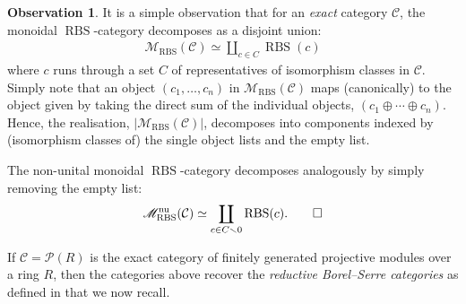 \documentclass[12pt, reqno]{amsart}
\theoremstyle{plain}
\theoremstyle{definition}
\newtheorem{observation}[theorem]{Observation}
\begin{document}
\begin{observation}\label{decomposition of monoidal RBS}
It is a simple observation that for an \textit{exact} category $\mathcal{C}$, the monoidal $\operatorname{RBS}$-category decomposes as a disjoint union:
\begin{align*}
\mathscr{M}_{\operatorname{RBS}}(\mathcal{C})\simeq \coprod_{c\in C}\operatorname{RBS}(c)
\end{align*}
where $c$ runs through a set $C$ of representatives of isomorphism classes in $\mathcal{C}$. Simply note that an object $(c_1,\ldots,c_n)$ in $\mathscr{M}_{\operatorname{RBS}}(\mathcal{C})$ maps (canonically) to the object given by taking the direct sum of the individual objects, $(c_1\oplus \cdots \oplus c_n)$. Hence, the realisation, $|\mathscr{M}_{\operatorname{RBS}}(\mathcal{C})|$, decomposes into components indexed by (isomorphism classes of) the single object lists and the empty list.

The non-unital monoidal $\operatorname{RBS}$-category decomposes analogously by simply removing the empty list:
\begin{equation*}
\mathscr{M}_{\operatorname{RBS}}^{\operatorname{nu}}(\mathcal{C})\simeq \coprod_{c\in C\smallsetminus 0}\operatorname{RBS}(c). \qedhere
\end{equation*}
\end{observation}

If $\mathcal{C}=\mathcal{P}(R)$ is the exact category of finitely generated projective modules over a ring $R$, then the categories above recover the \textit{reductive Borel--Serre categories} as defined in \cite[\S 5]{ClausenOrsnesJansen} that we now recall.
\end{document}
